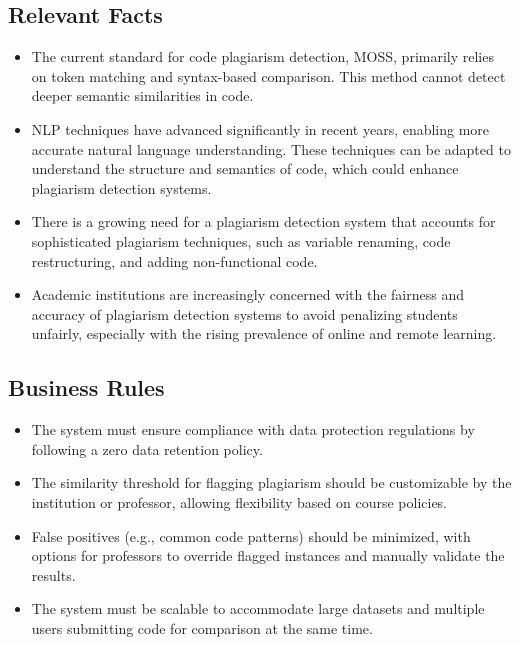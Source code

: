 \documentclass[12pt]{article}
\begin{document}
\subsection{Relevant Facts}
\begin{itemize}
  \item The current standard for code plagiarism detection, MOSS, primarily relies on token matching and syntax-based comparison. This method cannot detect deeper semantic similarities in code.
  \item NLP techniques have advanced significantly in recent years, enabling more accurate natural language understanding. These techniques can be adapted to understand the structure and semantics of code, which could enhance plagiarism detection systems.
  \item There is a growing need for a plagiarism detection system that accounts for sophisticated plagiarism techniques, such as variable renaming, code restructuring, and adding non-functional code.
  \item Academic institutions are increasingly concerned with the fairness and accuracy of plagiarism detection systems to avoid penalizing students unfairly, especially with the rising prevalence of online and remote learning.
\end{itemize}
\subsection{Business Rules}
\begin{itemize}
  \item The system must ensure compliance with data protection regulations by following a zero data retention policy.
  \item The similarity threshold for flagging plagiarism should be customizable by the institution or professor, allowing flexibility based on course policies.
  \item False positives (e.g., common code patterns) should be minimized, with options for professors to override flagged instances and manually validate the results.
  \item The system must be scalable to accommodate large datasets and multiple users submitting code for comparison at the same time.
\end{itemize}
\end{document}
